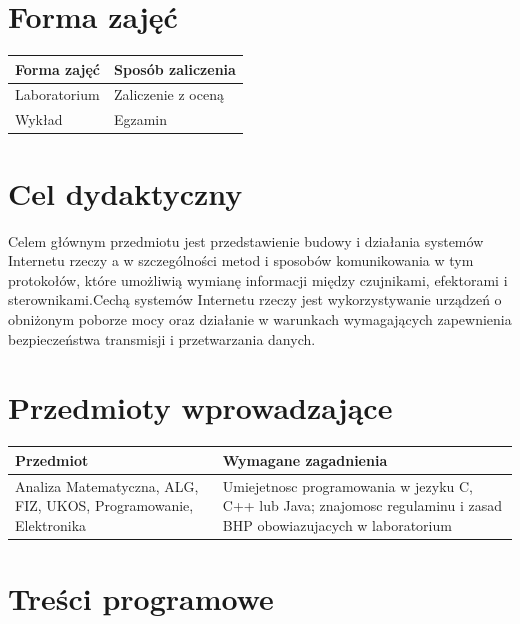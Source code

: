 \documentclass[12pt, a4paper]{article}
\begin{document}
\section{Forma zajęć}

\begin{tabular}{ll}
  \hline
  \textbf{Forma zajęć} & \textbf{Sposób zaliczenia} \\
  \hline
  Laboratorium & Zaliczenie z oceną \\
  Wykład & Egzamin \\
  \hline
\end{tabular}

\section{Cel dydaktyczny}

Celem głównym przedmiotu jest przedstawienie budowy i działania systemów Internetu rzeczy a w szczególności metod i sposobów komunikowania w tym protokołów, które umożliwią wymianę informacji między czujnikami, efektorami i sterownikami.Cechą systemów Internetu rzeczy jest wykorzystywanie urządzeń o obniżonym poborze mocy oraz działanie w warunkach wymagających zapewnienia bezpieczeństwa transmisji i przetwarzania danych.

\section{Przedmioty wprowadzające}

\begin{tabularx}{\textwidth}{lX}
  \hline
  \textbf{Przedmiot} & \textbf{Wymagane zagadnienia} \\
  \hline
  Analiza Matematyczna, ALG, FIZ, UKOS, Programowanie, Elektronika & Umiejetnosc programowania w jezyku C, C++ lub Java; znajomosc regulaminu i zasad BHP obowiazujacych w laboratorium \\
  \hline
\end{tabularx}

\section{Treści programowe}
\end{document}
